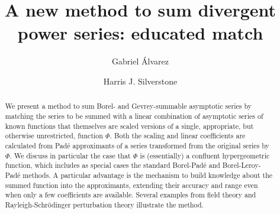 \documentclass[12pt]{iopart}
\begin{document}
\title{A new method to sum divergent power series: educated match}

\author{Gabriel \'Alvarez}
\address{Departamento de F\'{\i}sica Te\'orica II,
                               Facultad de Ciencias F\'{\i}sicas,
                               Universidad Complutense,
                               28040 Madrid, Spain}
\author{Harris J. Silverstone}
\address{ Department of Chemistry,
                The Johns Hopkins University,
                3400 N. Charles Street,
                Baltimore, Maryland 21218, USA}
\begin{abstract}
We present a method to sum Borel- and Gevrey-summable asymptotic series by matching the series
to be summed with a linear combination of asymptotic series of known functions that themselves are scaled versions
of a single, appropriate, but otherwise unrestricted, function $\Phi$.  Both the scaling and
linear coefficients are calculated from Pad\'e approximants of a series 
transformed from the original series by $\Phi$. We discuss in particular
the case that $\Phi$ is (essentially) a confluent hypergeometric function, which includes as
special cases the standard Borel-Pad\'e and Borel-Leroy-Pad\'e methods. A particular advantage is the mechanism to
build knowledge about the summed function into
the approximants, extending their accuracy and range even
when only a few coefficients are available. 
Several examples from field theory and Rayleigh-Schr\"odinger perturbation theory illustrate the method.
\end{abstract}
\maketitle
\end{document}
